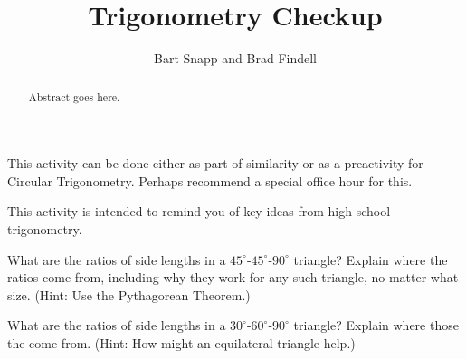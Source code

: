 \documentclass{ximera}
\title{Trigonometry Checkup}
\author{Bart Snapp and Brad Findell}
\begin{document}
\begin{abstract}
Abstract goes here.  
\end{abstract}
\maketitle

\begin{teachingnote}
This activity can be done either as part of similarity or as a preactivity for Circular Trigonometry.  Perhaps recommend a special office hour for this.  
\end{teachingnote}
This activity is intended to remind you of key ideas from high school trigonometry. 

\begin{problem}
What are the ratios of side lengths in a $45^\circ$-$45^\circ$-$90^\circ$ triangle?  Explain where the ratios come from, including why they work for any such triangle, no matter what size.  (Hint: Use the Pythagorean Theorem.)
\end{problem}

\vspace{0.1in}

\begin{problem}
What are the ratios of side lengths in a $30^\circ$-$60^\circ$-$90^\circ$ triangle?  Explain where those the come from.  (Hint: How might an equilateral triangle help.)
\end{problem}

\vspace{0.1in}
\end{document}

